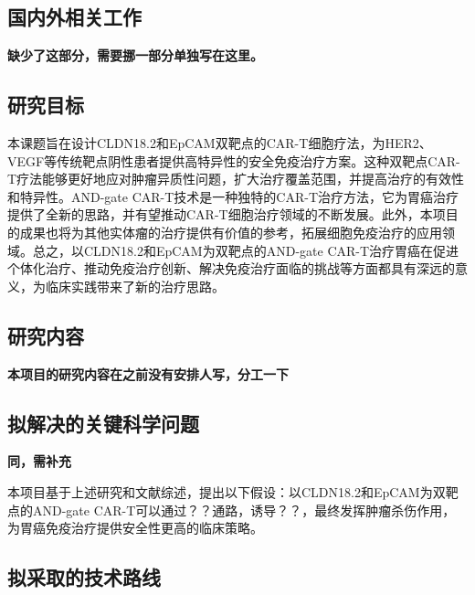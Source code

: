 \documentclass[12pt]{article}
\begin{document}
\subsection{国内外相关工作}

\textbf{缺少了这部分，需要挪一部分单独写在这里。}

{


}



\subsection{研究目标}

本课题旨在设计CLDN18.2和EpCAM双靶点的CAR-T细胞疗法，为HER2、VEGF等传统靶点阴性患者提供高特异性的安全免疫治疗方案。这种双靶点CAR-T疗法能够更好地应对肿瘤异质性问题，扩大治疗覆盖范围，并提高治疗的有效性和特异性。AND-gate CAR-T技术是一种独特的CAR-T治疗方法，它为胃癌治疗提供了全新的思路，并有望推动CAR-T细胞治疗领域的不断发展。此外，本项目的成果也将为其他实体瘤的治疗提供有价值的参考，拓展细胞免疫治疗的应用领域。总之，以CLDN18.2和EpCAM为双靶点的AND-gate CAR-T治疗胃癌在促进个体化治疗、推动免疫治疗创新、解决免疫治疗面临的挑战等方面都具有深远的意义，为临床实践带来了新的治疗思路。




\subsection{研究内容}

\textbf{本项目的研究内容在之前没有安排人写，分工一下}

\subsection{拟解决的关键科学问题}

\textbf{同，需补充}

本项目基于上述研究和文献综述，提出以下假设：以CLDN18.2和EpCAM为双靶点的AND-gate CAR-T可以通过？？通路，诱导？？，最终发挥肿瘤杀伤作用，为胃癌免疫治疗提供安全性更高的临床策略。



\subsection{拟采取的技术路线}
\end{document}
